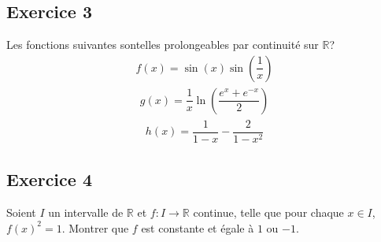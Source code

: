 \documentclass[letterpaper,10pt,french]{jupyterBook}
\begin{document}
\subsection{Exercice 3}
\label{\detokenize{exo3:exercice-3}}
\sphinxAtStartPar
Les fonctions suivantes sont\sphinxhyphen{}elles prolongeables par continuité sur \(\mathbb{R}\)?
\begin{equation*}
\begin{split}
f(x) = \sin(x)\sin(\dfrac{1}{x})
\end{split}
\end{equation*}\begin{equation*}
\begin{split}
g(x) = \dfrac{1}{x}\ln(\dfrac{e^x + e^{-x}}{2})
\end{split}
\end{equation*}\begin{equation*}
\begin{split}
h(x)= \dfrac{1}{1-x} - \dfrac{2}{1-x^2}
\end{split}
\end{equation*}

\subsection{Exercice 4}
\label{\detokenize{exo3:exercice-4}}
\sphinxAtStartPar
Soient \(I\) un intervalle de \(\mathbb{R}\) et \(f  : I\rightarrow \mathbb{R}\) continue, telle que pour chaque \(x \in I\), \(f(x)^2=1\). Montrer que \(f\) est constante et égale à \(1\) ou \(-1\).
\end{document}
